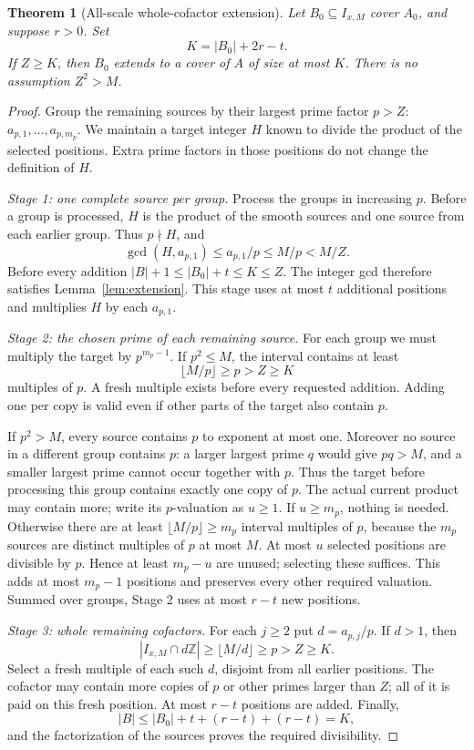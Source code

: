 \documentclass[11pt,a4paper]{article}
\newtheorem{theorem}{Theorem}[section]
\theoremstyle{remark}
\newcommand{\II}{I_{x,M}}
\begin{document}
\begin{theorem}[All-scale whole-cofactor extension]\label{thm:peeling}
Let $B_0\subseteq\II$ cover $A_0$, and suppose $r>0$. Set
\[
 K=|B_0|+2r-t.
\]
If $Z\ge K$, then $B_0$ extends to a cover of $A$ of size at most $K$.
There is no assumption $Z^2>M$.
\end{theorem}
\begin{proof}
Group the remaining sources by their largest prime factor $p>Z$:
$a_{p,1},\ldots,a_{p,m_p}$. We maintain a target integer $H$ known to
divide the product of the selected positions. Extra prime factors in
those positions do not change the definition of $H$.

\emph{Stage 1: one complete source per group.}
Process the groups in increasing $p$. Before a group is processed, $H$
is the product of the smooth sources and one source from each earlier
group. Thus $p\nmid H$, and
\[
 \gcd(H,a_{p,1})\le a_{p,1}/p\le M/p<M/Z.
\]
Before every addition $|B|+1\le |B_0|+t\le K\le Z$. The integer gcd
therefore satisfies Lemma~\ref{lem:extension}. This stage uses at most
$t$ additional positions and multiplies $H$ by each $a_{p,1}$.

\emph{Stage 2: the chosen prime of each remaining source.}
For each group we must multiply the target by $p^{m_p-1}$.
If $p^2\le M$, the interval contains at least
\[
 \lfloor M/p\rfloor\ge p>Z\ge K
\]
multiples of $p$. A fresh multiple exists before every requested
addition. Adding one per copy is valid even if other parts of the target
also contain $p$.

If $p^2>M$, every source contains $p$ to exponent at most one. Moreover
no source in a different group contains $p$: a larger largest prime $q$
would give $pq>M$, and a smaller largest prime cannot occur together
with $p$. Thus the target before processing this group contains exactly
one copy of $p$. The actual current product may contain more; write its
$p$-valuation as $u\ge1$. If $u\ge m_p$, nothing is needed. Otherwise
there are at least $\lfloor M/p\rfloor\ge m_p$ interval multiples of $p$,
because the $m_p$ sources are distinct multiples of $p$ at most $M$.
At most $u$ selected positions are divisible by $p$. Hence at least
$m_p-u$ are unused; selecting these suffices. This adds at most $m_p-1$
positions and preserves every other required valuation.
Summed over groups, Stage 2 uses at most $r-t$ new positions.

\emph{Stage 3: whole remaining cofactors.}
For each $j\ge2$ put $d=a_{p,j}/p$. If $d>1$, then
\[
 |\II\cap d\mathbb Z|\ge\lfloor M/d\rfloor\ge p>Z\ge K.
\]
Select a fresh multiple of each such $d$, disjoint from all earlier
positions. The cofactor may contain more copies of $p$ or other primes
larger than $Z$; all of it is paid on this fresh position. At most $r-t$
positions are added. Finally,
\[
 |B|\le |B_0|+t+(r-t)+(r-t)=K,
\]
and the factorization of the sources proves the required divisibility.
\end{proof}
\end{document}
